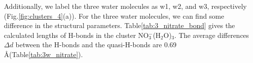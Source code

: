   Additionally, we label the three water molecules as w1, w2, and w3, respectively (Fig.\thinspace\ref{fig:clusters_4}(a)). 
  For the three water molecules, we can find some difference in the structural parameters.
  Table\thinspace\ref{tab:3_nitrate_bond} gives the calculated lengths of H-bonds in the cluster NO$_3^-$(H$_2$O)$_3$. 
  The average differences $\Delta{d}$ between the H-bonds and the quasi-H-bonds are 0.69 \AA (Table\thinspace\ref{tab:3w_nitrate}). 
